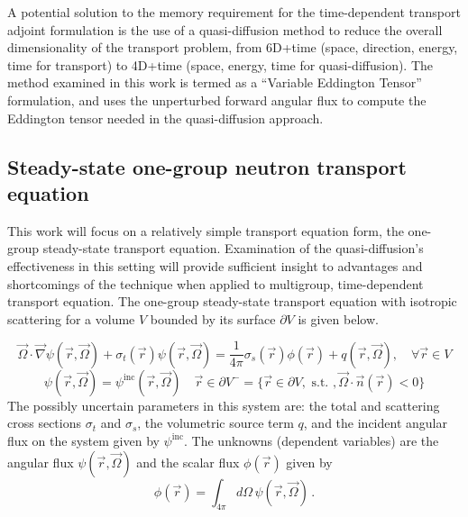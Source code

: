 \documentclass[12pt]{report}
\newcommand{\vr}{\vec{r}}
\newcommand{\vO}{\vec{\Omega}}
\newcommand{\grad}{\vec{\nabla}}
\newcommand{\sigt}{\sigma_t}
\newcommand{\sigs}{\sigma_s}
\begin{document}
A potential solution to the memory requirement for the time-dependent transport adjoint formulation is the use of a quasi-diffusion method to reduce the overall dimensionality of the transport problem, from 6D+time (space, direction, energy, time for transport) to 4D+time (space, energy, time for quasi-diffusion). The method examined in this work is termed  as a ``Variable Eddington Tensor'' formulation, and uses the unperturbed forward angular flux to compute the Eddington tensor needed in the quasi-diffusion approach.


\subsection{Steady-state one-group neutron transport equation}

This work will focus on a relatively simple transport equation form, the one-group steady-state transport equation. Examination of the quasi-diffusion's effectiveness in this setting will provide sufficient insight to advantages and shortcomings of the technique when applied to multigroup, time-dependent transport equation. The one-group steady-state transport equation with isotropic scattering for a volume $V$ bounded by its surface $\partial V$ is given below.

\begin{equation}
\label{SS1GTE}
\vO \cdot \grad \psi(\vr,\vO) + \sigt(\vr) \psi(\vr,\vO) = \frac{1}{4 \pi} \sigs(\vr) \phi(\vr) + q(\vr,\vO), \quad \forall \vr \in V
\end{equation}
\begin{equation}
\label{SS1GTE_bc}
\psi(\vr,\vO) = \psi^{\text{inc}}(\vr,\vO) \quad \vr \in \partial V^{-} = \{ \vr \in \partial V, \text{ s.t. }, \vO \cdot \vec{n}(\vr) < 0\}
\end{equation}
The possibly uncertain parameters in this system are: the total and scattering cross sections $\sigt$ and $\sigs$, the volumetric source term $q$, and the incident angular flux on the system given by $\psi^{\text{inc}}$. The unknowns (dependent variables) are the angular flux $\psi(\vr,\vO)$ and the scalar flux $\phi(\vr)$ given by
\[
\phi(\vr) = \int_{4\pi}d\Omega\,\psi(\vr,\vO) \,.
\]
\end{document}
